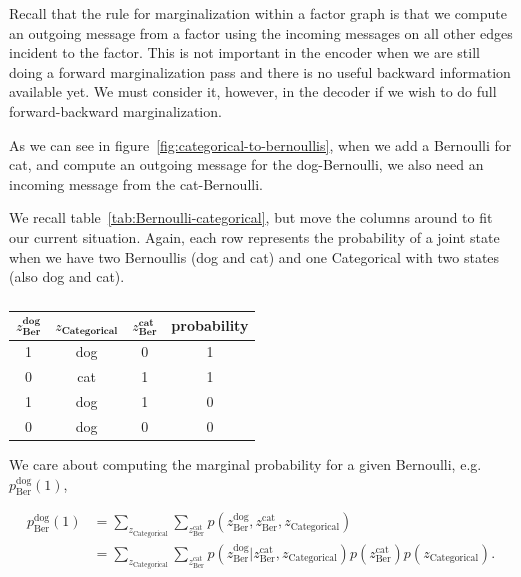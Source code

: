 \documentclass{article}
\begin{document}
Recall that the rule for marginalization within a factor graph is that we compute an outgoing message from a factor using the incoming messages on all other edges incident to the factor.  This is not important in the encoder when we are still doing a forward marginalization pass and there is no useful backward information available yet.  We must consider it, however, in the decoder if we wish to do full forward-backward marginalization. %

As we can see in figure~\ref{fig:categorical-to-bernoullis}, when we add a Bernoulli for cat, and compute an outgoing message for the dog-Bernoulli, we also need an incoming message from the cat-Bernoulli.

We recall table~\ref{tab:Bernoulli-categorical}, but move the columns around to fit our current situation.  Again, each row represents the probability of a joint state when we have two Bernoullis (dog and cat) and one Categorical with two states (also dog and cat).

\begin{table}[H]
    \setlength{\extrarowheight}{5pt}
    \centering
    \begin{tabular}{c|c|c|c}
        \hline\hline
        \textbf{$z^{\textbf{dog}}_{\textbf{Ber}}$} & \textbf{$z_{\textbf{Categorical}}$} & \textbf{$z^{\textbf{cat}}_{\textbf{Ber}}$} & \textbf{probability} \\[1ex]
        \hline
        1          & dog    & 0          & 1 \\
        0          & cat    & 1          & 1 \\
        1          & dog    & 1          & 0 \\
        0          & dog    & 0          & 0 \\[1ex]
        \hline
    \end{tabular}
    \caption{}
    \label{tab:categorical-bernoulli}
\end{table}

We care about computing the marginal probability for a given Bernoulli, e.g. $p^{\text{dog}}_{\text{Ber}}(1)$,

\begin{align}
    p^{\text{dog}}_{\text{Ber}}(1) 
    &= \sum_{z_{\text{Categorical}}} \sum_{z^{\text{cat}}_{\text{Ber}}} p(z^{\text{dog}}_{\text{Ber}}, z^{\text{cat}}_{\text{Ber}}, z_{\text{Categorical}}) 
    \nonumber \\
    &= 
    \sum_{z_{\text{Categorical}}} \sum_{z^{\text{cat}}_{\text{Ber}}} 
    p(z^{\text{dog}}_{\text{Ber}}| z^{\text{cat}}_{\text{Ber}}, z_{\text{Categorical}})p(z^{\text{cat}}_{\text{Ber}})
    p(z_{\text{Categorical}}).
\end{align}
\end{document}
